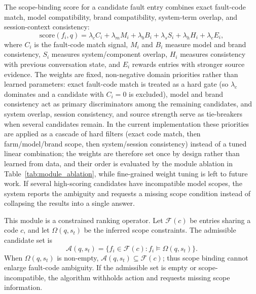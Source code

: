 \documentclass[lettersize,journal]{IEEEtran}
\begin{document}
The scope-binding score for a candidate fault entry combines exact fault-code match, model compatibility, brand compatibility, system-term overlap, and session-context consistency:
\begin{equation}
\mathrm{score}(f_i,q)=\lambda_c C_i+\lambda_m M_i+\lambda_b B_i+\lambda_s S_i+\lambda_h H_i+\lambda_e E_i,
\end{equation}
where $C_i$ is the fault-code match signal, $M_i$ and $B_i$ measure model and brand consistency, $S_i$ measures system/component overlap, $H_i$ measures consistency with previous conversation state, and $E_i$ rewards entries with stronger source evidence. The weights are fixed, non-negative domain priorities rather than learned parameters: exact fault-code match is treated as a hard gate (so $\lambda_c$ dominates and a candidate with $C_i{=}0$ is excluded), model and brand consistency act as primary discriminators among the remaining candidates, and system overlap, session consistency, and source strength serve as tie-breakers when several candidates remain. In the current implementation these priorities are applied as a cascade of hard filters (exact code match, then farm/model/brand scope, then system/session consistency) instead of a tuned linear combination; the weights are therefore set once by design rather than learned from data, and their order is evaluated by the module ablation in Table~\ref{tab:module_ablation}, while fine-grained weight tuning is left to future work. If several high-scoring candidates have incompatible model scopes, the system reports the ambiguity and requests a missing scope condition instead of collapsing the results into a single answer.

This module is a constrained ranking operator. Let $\mathcal{F}(c)$ be entries sharing a code $c$, and let $\Omega(q,s_t)$ be the inferred scope constraints. The admissible candidate set is
\begin{equation}
\mathcal{A}(q,s_t)=\{f_i\in \mathcal{F}(c): f_i \models \Omega(q,s_t)\}.
\end{equation}
When $\Omega(q,s_t)$ is non-empty, $\mathcal{A}(q,s_t)\subseteq \mathcal{F}(c)$; thus scope binding cannot enlarge fault-code ambiguity. If the admissible set is empty or scope-incompatible, the algorithm withholds action and requests missing scope information.
\end{document}
